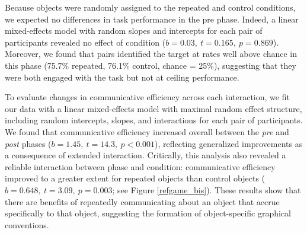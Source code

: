 \documentclass[10pt,letterpaper]{article}
\begin{document}
Because objects were randomly assigned to the repeated and control conditions, we expected no differences in task performance in the pre phase. Indeed, a linear mixed-effects model with random slopes and intercepts for each pair of participants revealed no effect of condition ($b = 0.03, ~t = 0.165, ~p = 0.869$). Moreover, we found that pairs identified the target at rates well above chance in this phase (75.7\% repeated, 76.1\% control, chance = 25\%), suggesting that they were both engaged with the task but not at ceiling performance.


To evaluate changes in communicative efficiency across each interaction, we fit our data with a linear mixed-effects model with maximal random effect structure, including random intercepts, slopes, and interactions for each pair of participants. 
We found that communicative efficiency increased overall between the \textit{pre} and \textit{post} phases ($b = 1.45,~t = 14.3,~p <0.001$), reflecting generalized improvements as a consequence of extended interaction.
Critically, this analysis also revealed a reliable interaction between phase and condition: communicative efficiency improved to a greater extent for repeated objects than control objects ($b = 0.648, ~t = 3.09,~p = 0.003$; see Figure \ref{refgame_bis}). 
These results show that there are benefits of repeatedly communicating about an object that accrue specifically to that object, suggesting the formation of object-specific graphical conventions. 
 


\end{document}
